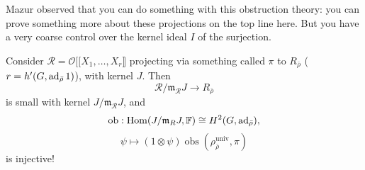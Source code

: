 \documentclass[reqno]{amsart} 
\begin{document}
Mazur observed that you can do something with this obstruction theory: you can prove something more about these projections on the top line here.  But you have a very coarse control over the kernel ideal $I$ of the surjection.
\begin{theorem}\label{theorem:cq6thpd9ja}
  Consider $\mathcal{R}  = \mathcal{O} [[  X_1, \dotsc, X_r \rrbracket$ projecting via something called $\pi$ to $R_{\bar{\rho}}$ ($r = h'(G, \operatorname{ad}_{\bar{\rho}} 1)$), with kernel $J$.  Then
  \begin{equation*}
    \mathcal{R} / \mathfrak{m}_{\mathcal{R}} J \rightarrow R_{\bar{\rho}}
  \end{equation*}
  is small with kernel $J / \mathfrak{m}_{\mathcal{R}} J$, and
  \begin{equation*}
    \mathrm{o b} : \operatorname{Hom}(J / \mathfrak{m}_R J, \mathbb{F}) \cong H^2(G, \operatorname{ad}_{\bar{\rho}}),
  \end{equation*}
  \begin{equation*}
    \psi \mapsto(1 \otimes \psi) \operatorname{o b s} \left( \rho_{\bar{\rho}}^{\mathrm{univ}}, \pi \right)
  \end{equation*}
  is injective!
\end{theorem}
\end{document}
